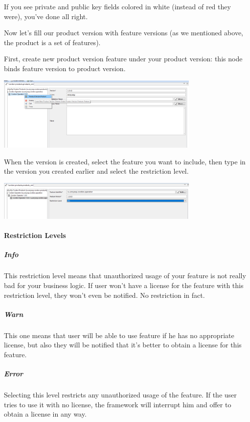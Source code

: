 \documentclass[12pt]{report}
\begin{document}
If you see private and public key fields colored in white (instead of red they were), you've done all right.

Now let's fill our product version with feature versions (as we mentioned above, the product is a set of features).

First, create new product version feature under your product version: this node binds feature version to product version.

\begin{center}
    \includegraphics[width=0.75\textwidth]{product_feature_create}
\end{center}

When the version is created, select the feature you want to include, then type in the version you created earlier and select the restriction level.

\begin{center}
    \includegraphics[width=0.75\textwidth]{product_feature_created}
\end{center}

\paragraph*{Restriction Levels}

\subparagraph*{Info}
This restriction level means that unauthorized usage of your feature is not really bad for your business logic. If user won't have a license for the feature with this restriction
level, they won't even be notified. No restriction in fact.

\subparagraph*{Warn}
This one means that user will be able to use feature if he has no appropriate license, but also they will be notified that it's better to obtain a license for this feature.

\subparagraph*{Error}
Selecting this level restricts any unauthorized usage of the feature. If the user tries to use it with no license, the framework will interrupt him and offer to obtain a license in any way.
\end{document}
